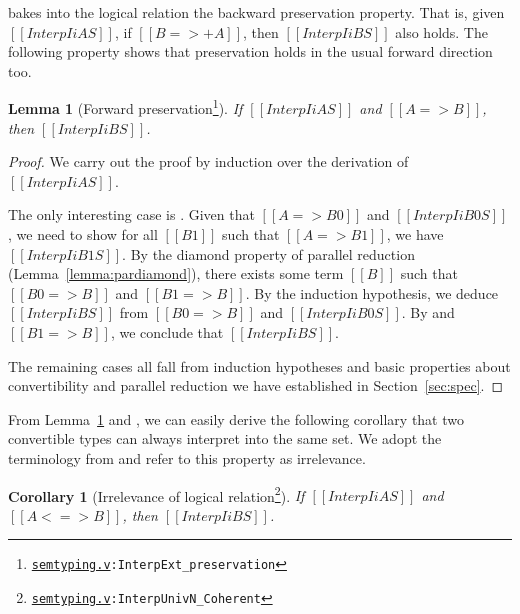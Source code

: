 \documentclass[\ifpublic nolinenum\else\fi,online,OA]{jfp}
\newcommand{\dotv}[2]{\href{#1}{\texttt{#1}}{\texttt{:#2}}}
\newtheorem{lemma}[theorem]{Lemma}
\newtheorem{corollary}[theorem]{Corollary}
\theoremstyle{definition}
\begin{document}
 bakes into the logical relation the backward preservation
property. That is, given $[[Interp I i A S]]$, if $[[B =>+ A]]$, then
$[[Interp I i B S]]$ also holds. The following property shows that
preservation holds in the usual forward direction too.
\begin{lemma}[Forward preservation\footnote{\dotv{semtyping.v}{InterpExt\_preservation}}]
  \label{lemma:interppreservation}
  If $[[Interp I i A S]]$ and $[[A => B]]$, then $[[Interp I i B S]]$.
\end{lemma}
\begin{proof}
  We carry out the proof by induction over the derivation of $[[Interp
  I i A S]]$.

  The only interesting case is . Given that
  $[[A => B0]]$ and $[[Interp I i B0 S]]$, we need to show
  for all  $[[B1]]$ such that $[[A => B1]]$, we have $[[Interp I i B1
  S]]$. By the diamond property of parallel reduction
  (Lemma~\ref{lemma:pardiamond}), there exists some term $[[B]]$ such
  that $[[B0 => B]]$ and $[[B1 => B]]$. By the induction hypothesis,
  we deduce $[[Interp I i B S]]$ from $[[B0 => B]]$ and $[[Interp I i
  B0 S]]$. By  and $[[B1 => B]]$, we conclude that
  $[[Interp I i B S]]$.

  The remaining cases all fall from induction hypotheses and basic
  properties about convertibility and parallel reduction we have
  established in Section~\ref{sec:spec}.
\end{proof}
From Lemma~\ref{lemma:interppreservation} and , we can easily
derive the following corollary that two convertible types can always interpret
into the same set. We adopt the terminology from \citet{martin-lof-a-la-coq}
and refer to this property as irrelevance.
\begin{corollary}[Irrelevance of logical relation\footnote{\dotv{semtyping.v}{InterpUnivN\_Coherent}}]
  \label{lemma:logrelcoherence}
  If $[[Interp I i A S]]$ and $[[A <=> B]]$, then $[[Interp I i B S]]$.
\end{corollary}
\end{document}
